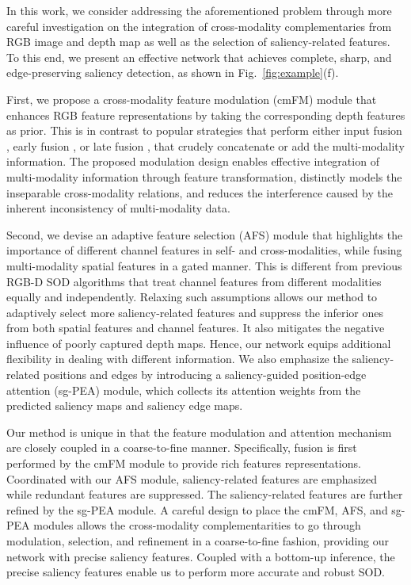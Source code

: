 \documentclass[runningheads]{llncs}
\begin{document}
In this work, we consider addressing the aforementioned problem through more careful investigation on the integration of cross-modality complementaries from RGB image and depth map as well as the selection of saliency-related features.
To this end, we present an effective network that achieves complete, sharp, and edge-preserving saliency detection, as shown in Fig.~\ref{fig:example}(f).

First, we propose a cross-modality feature modulation (cmFM) module that  enhances RGB feature representations by taking the corresponding depth features as prior.
This is in contrast to popular strategies that perform either input fusion \cite{Peng2014}, early fusion \cite{DSS}, or late fusion \cite{CTMF}, that crudely concatenate or add the multi-modality information.
The proposed modulation design enables effective integration of multi-modality information through feature transformation, distinctly models the inseparable cross-modality relations, and reduces the interference caused by the inherent inconsistency of multi-modality data.

Second, we devise an adaptive feature selection (AFS) module that highlights the importance of different channel features in self- and cross-modalities, while fusing multi-modality spatial features in a gated manner.
This is different from previous RGB-D SOD algorithms \cite{PCFN,TAN,DCFF,MMCI,ASIF-Net,CPFP} that treat channel features from different modalities equally and independently.
Relaxing such assumptions allows our method to adaptively select more saliency-related features and suppress the inferior ones from both spatial features and channel features. It also mitigates the negative influence of poorly captured depth maps.
Hence, our network equips additional flexibility in dealing with different information.
We also emphasize the saliency-related positions and edges by introducing a saliency-guided position-edge attention (sg-PEA) module, which collects its attention weights from the predicted saliency maps and saliency edge maps.


Our method is unique in that the feature modulation and attention mechanism are closely coupled in a coarse-to-fine manner.
Specifically, fusion is first performed by the cmFM module to provide rich features representations. Coordinated with our AFS module, saliency-related features are emphasized while redundant features are suppressed. The saliency-related features are further refined by the sg-PEA module. A careful design to place the cmFM, AFS, and sg-PEA modules allows the cross-modality complementarities to go through modulation, selection, and refinement in a coarse-to-fine fashion, providing our network with precise saliency features.  Coupled with a bottom-up inference, the precise saliency features enable us to perform more accurate and robust SOD.
\end{document}
